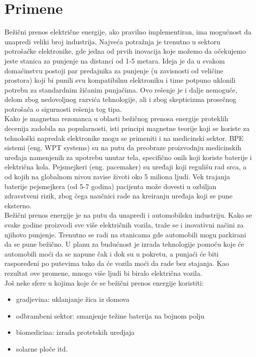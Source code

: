 \documentclass[a4paper]{article}
\begin{document}
\section{Primene}
\label{sec:Primene}
Bežični prenos električne energije, ako pravilno implementiran, ima mogućnost da unapredi veliki broj industrija. Najveća potražnja je trenutno u sektoru potrošačke elektronike, gde jedna od prvih inovacija koje možemo da očekujemo jeste stanica za punjenje na distanci od 1-5 metara. \cite{a} Ideja je da u svakom domaćinstvu postoji par predajnika za punjenje (u zavisnosti od veličine prostora) koji bi punili svu kompatibilnu elektroniku i time potpuno uklonili potrebu za standardnim žičanim punjačima. Ovo rešenje je i dalje nemoguće, delom zbog nedovoljnog razvića tehnologije, ali i zbog skepticizma prosečnog potrošača o sigurnosti rešenja tog tipa. 
\\[10pt]
Kako je magnetna rezonanca u oblasti bežičnog prenosa energije proteklih decenija zadobila na popularnosti, isti principi magnetne teorije koji se koriste za tehnološki napredak elektronike mogu se primeniti i na medicinski sektor. \cite{b} BPE sistemi (eng. WPT systems) su na putu da preobraze proizvodnju medicinskih uređaja namenjenih za upotrebu unutar tela, specifično onih koji koriste baterije i električna kola. Pejsmejkeri (eng. pacemaker) su uređaji koji regulišu rad srca, a od kojih na globalnom nivou zavise životi oko 5 miliona ljudi. Vek trajanja baterije pejsmejkera (od 5-7 godina) \cite{c} pacijenta može dovesti u ozbiljan zdravstveni rizik, zbog čega naučnici rade na kreiranju uređaja koji se pune eksterno. 
\\[10pt]
Bežični prenos energije je na putu da unapredi i automobilsku industriju. Kako se svake godine proizvodi sve više električnih vozila, traže se i inovativni načini za njihovo punjenje. Trenutno se radi na stanicama gde automobili mogu parkirani da se pune bežično. U planu za budućnost je izrada tehnologije pomoću koje će automobili moći da se napune čak i dok su u pokretu, a punjaći će biti raspoređeni po putevima tako da će vozila moći da rade bez stajanja. Kao rezultat ove promene, mnogo više ljudi bi biralo električna vozila. 
\\[10pt]
Još neke sfere u kojima koje će se bežični prenos energije koristiti:
\begin{itemize}
 \item gradjevina: uklanjanje žica iz domova
 \item odbrambeni sektor: smanjenje težine baterija na bojnom polju
 \item biomedicina: izrada protetskih uredjaja
 \item solarne ploče itd.
\end{itemize}
\end{document}
